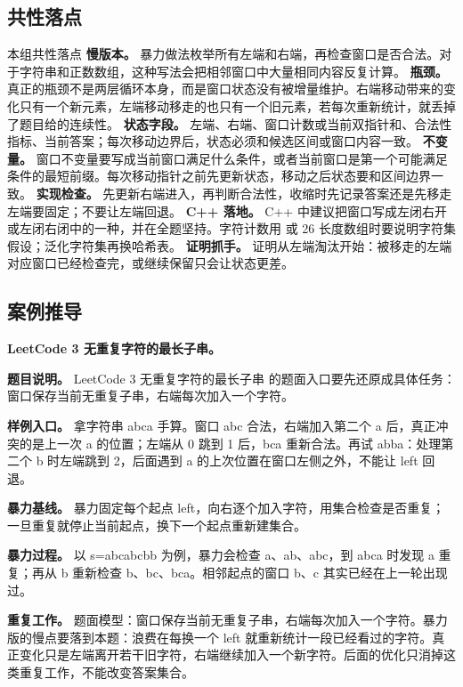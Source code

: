 \subsection{共性落点}

\begin{principlebox}{本组共性落点}
\textbf{慢版本。} 暴力做法枚举所有左端和右端，再检查窗口是否合法。对于字符串和正数数组，这种写法会把相邻窗口中大量相同内容反复计算。
\textbf{瓶颈。} 真正的瓶颈不是两层循环本身，而是窗口状态没有被增量维护。右端移动带来的变化只有一个新元素，左端移动移走的也只有一个旧元素，若每次重新统计，就丢掉了题目给的连续性。
\textbf{状态字段。} 左端、右端、窗口计数或当前双指针和、合法性指标、当前答案；每次移动边界后，状态必须和候选区间或窗口内容一致。
\textbf{不变量。} 窗口不变量要写成当前窗口满足什么条件，或者当前窗口是第一个可能满足条件的最短前缀。每次移动指针之前先更新状态，移动之后状态要和区间边界一致。
\textbf{实现检查。} 先更新右端进入，再判断合法性，收缩时先记录答案还是先移走左端要固定；不要让左端回退。
\textbf{C++ 落地。} C++ 中建议把窗口写成左闭右开或左闭右闭中的一种，并在全题坚持。字符计数用  或 26 长度数组时要说明字符集假设；泛化字符集再换哈希表。
\textbf{证明抓手。} 证明从左端淘汰开始：被移走的左端对应窗口已经检查完，或继续保留只会让状态更差。
\end{principlebox}

\subsection{案例推导}

\noindent\textbf{LeetCode 3 无重复字符的最长子串。}

\textbf{题目说明。} LeetCode 3 无重复字符的最长子串 的题面入口要先还原成具体任务：窗口保存当前无重复子串，右端每次加入一个字符。

\textbf{样例入口。} 拿字符串 abca 手算。窗口 abc 合法，右端加入第二个 a 后，真正冲突的是上一次 a 的位置；左端从 0 跳到 1 后，bca 重新合法。再试 abba：处理第二个 b 时左端跳到 2，后面遇到 a 的上次位置在窗口左侧之外，不能让 left 回退。

\textbf{暴力基线。} 暴力固定每个起点 left，向右逐个加入字符，用集合检查是否重复；一旦重复就停止当前起点，换下一个起点重新建集合。

\textbf{暴力过程。} 以 s=abcabcbb 为例，暴力会检查 a、ab、abc，到 abca 时发现 a 重复；再从 b 重新检查 b、bc、bca。相邻起点的窗口 b、c 其实已经在上一轮出现过。

\textbf{重复工作。} 题面模型：窗口保存当前无重复子串，右端每次加入一个字符。暴力版的慢点要落到本题：浪费在每换一个 left 就重新统计一段已经看过的字符。真正变化只是左端离开若干旧字符，右端继续加入一个新字符。后面的优化只消掉这类重复工作，不能改变答案集合。

